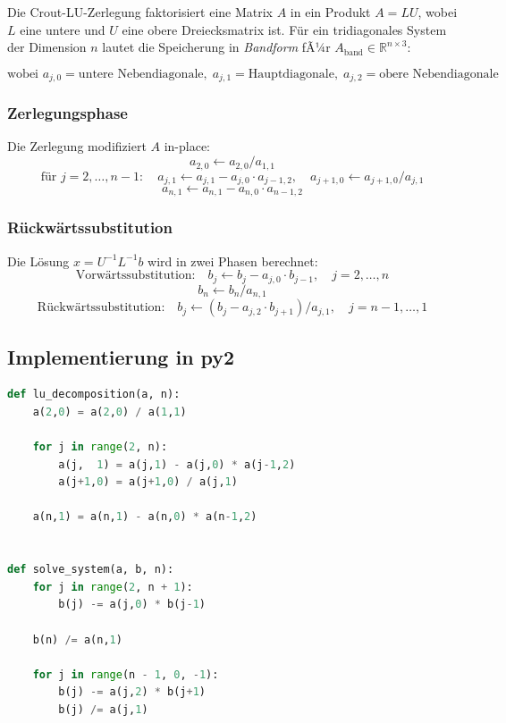 ﻿\documentclass[a4paper,12pt]{article}
\theoremstyle{definition}
\begin{document}
Die Crout-LU-Zerlegung faktorisiert eine Matrix $A$ in ein Produkt $A = LU$, wobei
$L$ eine untere und $U$ eine obere Dreiecksmatrix ist. F\"ur ein tridiagonales System
der Dimension $n$ lautet die Speicherung in \emph{Bandform} fÃ¼r $A_{\text{band}} \in \mathbb{R}^{n \times 3}$:

\[
	\text{wobei } a_{j,0} = \text{untere Nebendiagonale},\;
	a_{j,1} = \text{Hauptdiagonale},\;
	a_{j,2} = \text{obere Nebendiagonale}
\]

\subsubsection{Zerlegungsphase}

Die Zerlegung modifiziert $A$ in-place:
\[
	a_{2,0} \leftarrow a_{2,0} / a_{1,1}
\]
\[
	\text{f\"ur } j = 2, \ldots, n-1: \quad
	a_{j,1} \leftarrow a_{j,1} - a_{j,0} \cdot a_{j-1,2}, \quad
	a_{j+1,0} \leftarrow a_{j+1,0} / a_{j,1}
\]
\[
	a_{n,1} \leftarrow a_{n,1} - a_{n,0} \cdot a_{n-1,2}
\]

\subsubsection{R\"uckw\"artssubstitution}

Die L\"osung $x = U^{-1} L^{-1} b$ wird in zwei Phasen berechnet:
\[
	\text{Vorw\"artssubstitution:} \quad
	b_j \leftarrow b_j - a_{j,0} \cdot b_{j-1}, \quad j = 2, \ldots, n
\]
\[
	b_n \leftarrow b_n / a_{n,1}
\]
\[
	\text{R\"uckw\"artssubstitution:} \quad
	b_j \leftarrow (b_j - a_{j,2} \cdot b_{j+1}) / a_{j,1}, \quad j = n-1, \ldots, 1
\]

\subsection{Implementierung in py2}

\begin{lstlisting}[language=Python, caption={Vollst\"andige Crout-Implementierung in py2-Syntax}]
def lu_decomposition(a, n):
    a(2,0) = a(2,0) / a(1,1)

    for j in range(2, n):
        a(j,  1) = a(j,1) - a(j,0) * a(j-1,2)
        a(j+1,0) = a(j+1,0) / a(j,1)

    a(n,1) = a(n,1) - a(n,0) * a(n-1,2)


def solve_system(a, b, n):
    for j in range(2, n + 1):
        b(j) -= a(j,0) * b(j-1)

    b(n) /= a(n,1)

    for j in range(n - 1, 0, -1):
        b(j) -= a(j,2) * b(j+1)
        b(j) /= a(j,1)
\end{lstlisting}
\end{document}
